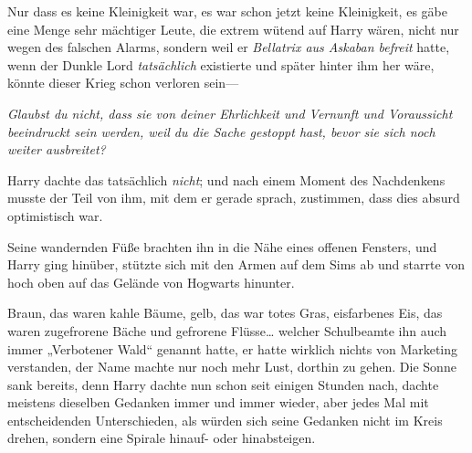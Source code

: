Nur dass es keine Kleinigkeit war, es war schon jetzt keine Kleinigkeit, es gäbe eine Menge sehr mächtiger Leute, die extrem wütend auf Harry wären, nicht nur wegen des falschen Alarms, sondern weil er \emph{Bellatrix aus Askaban befreit} hatte, wenn der Dunkle Lord \emph{tatsächlich} existierte und später hinter ihm her wäre, könnte dieser Krieg schon verloren sein—

\emph{Glaubst du nicht, dass sie von deiner Ehrlichkeit und Vernunft und Voraussicht beeindruckt sein werden, weil du die Sache gestoppt hast, bevor sie sich noch weiter ausbreitet?}

Harry dachte das tatsächlich \emph{nicht}; und nach einem Moment des Nachdenkens musste der Teil von ihm, mit dem er gerade sprach, zustimmen, dass dies absurd optimistisch war.

Seine wandernden Füße brachten ihn in die Nähe eines offenen Fensters, und Harry ging hinüber, stützte sich mit den Armen auf dem Sims ab und starrte von hoch oben auf das Gelände von Hogwarts hinunter.

Braun, das waren kahle Bäume, gelb, das war totes Gras, eisfarbenes Eis, das waren zugefrorene Bäche und gefrorene Flüsse… welcher Schulbeamte ihn auch immer „Verbotener Wald“ genannt hatte, er hatte wirklich nichts von Marketing verstanden, der Name machte nur noch mehr Lust, dorthin zu gehen. Die Sonne sank bereits, denn Harry dachte nun schon seit einigen Stunden nach, dachte meistens dieselben Gedanken immer und immer wieder, aber jedes Mal mit entscheidenden Unterschieden, als würden sich seine Gedanken nicht im Kreis drehen, sondern eine Spirale hinauf- oder hinabsteigen.

